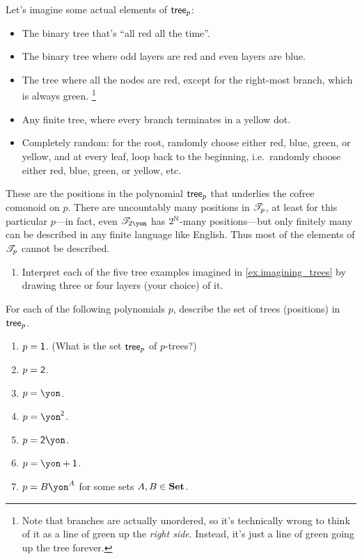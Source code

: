 \documentclass[Book-Poly]{subfiles}
\begin{document}
\begin{example}
Let's imagine some actual elements of $\mathsf{tree}_p$:
\begin{itemize}
	\item The binary tree that's ``all red all the time''.
	\item The binary tree where odd layers are red and even layers are blue.
	\item The tree where all the nodes are red, except for the right-most branch, which is always green.%
	\footnote{\;Note that branches are actually unordered, so it's technically wrong to think of it as a line of green up the \emph{right side}. Instead, it's just a line of green going up the tree forever.}
	\item Any finite tree, where every branch terminates in a yellow dot.
	\item Completely random: for the root, randomly choose either red, blue, green, or yellow, and at every leaf, loop back to the beginning, i.e.\ randomly choose either red, blue, green, or yellow, etc.
\end{itemize}
These are the positions in the polynomial $\mathsf{tree}_p$ that underlies the cofree comonoid on $p$. There are uncountably many positions in $\mathscr{T}_{p}$, at least for this particular $p$---in fact, even $\cofree{2\yon}$ has $2^{\mathbb{N}}$-many positions---but only finitely many can be described in any finite language like English. Thus most of the elements of $\mathscr{T}_{p}$ cannot be described.
\end{example}

\begin{exercise}\label{exc.trees_1}
\begin{enumerate}
	\item Interpret each of the five tree examples imagined in \cref{ex.imagining_trees} by drawing three or four layers (your choice) of it.
\end{enumerate}
For each of the following polynomials $p$, describe the set of trees (positions) in $\mathsf{tree}_{p}$.
\begin{enumerate}[resume]
	\item $p=\textsf{1}$. (What is the set $\mathsf{tree}_p$ of $p$-trees?)
	\item $p=\textsf{2}$.
	\item $p=\yon$.
	\item $p=\yon^\2$.
	\item $p={\2\yon}$.
	\item $p={\yon+\1}$.
	\item $p={B\yon^A}$ for some sets $A,B\in\mathbf{Set}$.
\qedhere
\end{enumerate}
\end{exercise}
\end{document}
